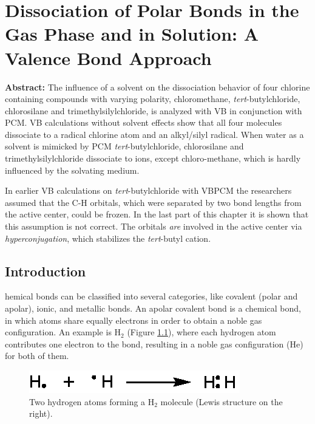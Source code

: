 \chapter{Dissociation of Polar Bonds in the Gas Phase and in Solution: A Valence Bond Approach}
\label{chap_dissociation}



\noindent\textbf{Abstract:} The influence of a solvent on the dissociation behavior of four chlorine containing compounds with varying polarity, chloromethane, \textit{tert}-butylchloride, chlorosilane and trimethylsilylchloride, is analyzed with VB in conjunction with PCM. VB calculations without solvent effects show that all four molecules dissociate to a radical chlorine atom and an alkyl/silyl radical. When water as a solvent is mimicked by PCM \textit{tert}-butylchloride, chlorosilane and trimethylsilylchloride dissociate to ions, except chloro-methane, which is hardly influenced by the solvating medium.

In earlier VB calculations on  \textit{tert}-butylchloride with VBPCM the researchers assumed that the C-H orbitals, which were separated by two bond lengths from the active center, could be frozen. In the last part of this chapter it is shown that this assumption is not correct. The orbitals \textit{are} involved in the active center via \textit{hyperconjugation}, which stabilizes the \textit{tert}-butyl cation. 

\clearpage

\section{Introduction}

\lettrine{}{}hemical bonds can be classified into several categories, like covalent (polar and apolar), ionic, and metallic bonds. An apolar covalent bond is a chemical bond, in which atoms share equally electrons in order to obtain a noble gas configuration. An example is H$_2$ (Figure \ref{ch3.fig.h_twee}), where each hydrogen atom contributes one electron to the bond, resulting in a noble gas configuration (He) for both of them.
\begin{figure}[ht]
\center
\includegraphics{dissociation/figures/h_twee.eps}
\caption{Two hydrogen atoms forming a H$_2$ molecule (Lewis structure on the right).}
\label{ch3.fig.h_twee} 
\end{figure}

